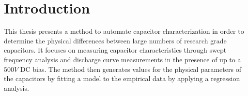 \section{Introduction}
\label{sec:intro}

This thesis presents a method to automate capacitor characterization in order to determine the physical differences between large numbers of research grade capacitors. It focuses on measuring capacitor characteristics through swept frequency analysis and discharge curve measurements in the presence of up to a $500V$ DC bias. The method then generates values for the physical parameters of the capacitors by fitting a model to the empirical data by applying a regression analysis.

